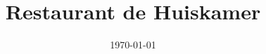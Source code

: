\documentclass{article}
\begin{document}
\title{Restaurant de Huiskamer}
\date{\today}
\end{document}
